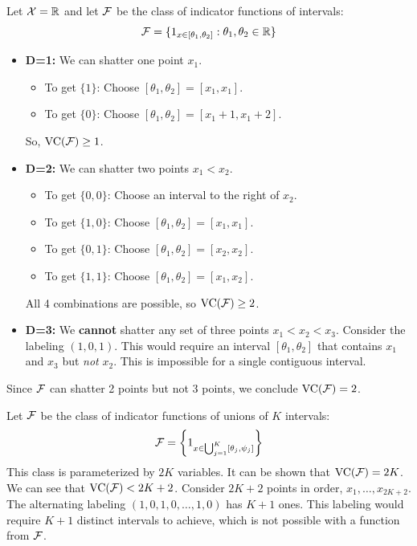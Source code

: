 \begin{eg}
Let $\mathcal{X} = \mathbb{R}$ and let $\mathcal{F}$ be the class of indicator functions of intervals:
$$
\mathcal{F} = \{ 1_{x \in [\theta_1, \theta_2]} : \theta_1, \theta_2 \in \mathbb{R} \}
$$
\begin{itemize}
    \item \textbf{D=1:} We can shatter one point $x_1$.
    \begin{itemize}
        \item To get $\{1\}$: Choose $[\theta_1, \theta_2] = [x_1, x_1]$.
        \item To get $\{0\}$: Choose $[\theta_1, \theta_2] = [x_1+1, x_1+2]$.
    \end{itemize}
    So, $\text{VC}(\mathcal{F}) \ge 1$.

    \item \textbf{D=2:} We can shatter two points $x_1 < x_2$.
    \begin{itemize}
        \item To get $\{0, 0\}$: Choose an interval to the right of $x_2$.
        \item To get $\{1, 0\}$: Choose $[\theta_1, \theta_2] = [x_1, x_1]$.
        \item To get $\{0, 1\}$: Choose $[\theta_1, \theta_2] = [x_2, x_2]$.
        \item To get $\{1, 1\}$: Choose $[\theta_1, \theta_2] = [x_1, x_2]$.
    \end{itemize}
    All 4 combinations are possible, so $\text{VC}(\mathcal{F}) \ge 2$.

    \item \textbf{D=3:} We \textbf{cannot} shatter any set of three points $x_1 < x_2 < x_3$.
    Consider the labeling $(1, 0, 1)$. This would require an interval $[\theta_1, \theta_2]$ that contains $x_1$ and $x_3$ but \emph{not} $x_2$. This is impossible for a single contiguous interval.
\end{itemize}
Since $\mathcal{F}$ can shatter 2 points but not 3 points, we conclude $\text{VC}(\mathcal{F}) = 2$.
\end{eg}

\begin{eg}
Let $\mathcal{F}$ be the class of indicator functions of unions of $K$ intervals:
$$
\mathcal{F} = \left\{ 1_{x \in \bigcup_{j=1}^K [\theta_j, \psi_j]} \right\}
$$
This class is parameterized by $2K$ variables. It can be shown that $\text{VC}(\mathcal{F}) = 2K$.
We can see that $\text{VC}(\mathcal{F}) < 2K+2$. Consider $2K+2$ points in order, $x_1, \dots, x_{2K+2}$. The alternating labeling $(1, 0, 1, 0, \dots, 1, 0)$ has $K+1$ ones. This labeling would require $K+1$ distinct intervals to achieve, which is not possible with a function from $\mathcal{F}$.
\end{eg}

